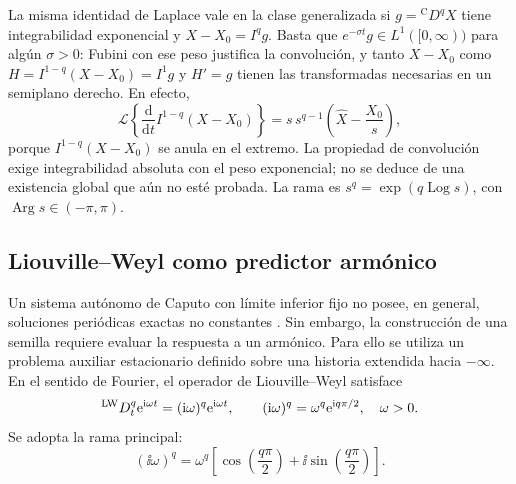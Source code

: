 La misma identidad de Laplace vale en la clase generalizada si
$g={}^{\mathrm C}D^qX$ tiene integrabilidad exponencial y
$X-X_0=I^qg$. Basta que $e^{-\sigma t}g\in L^1([0,\infty))$ para algún
$\sigma>0$: Fubini con ese peso justifica la convolución, y tanto
$X-X_0$ como $H=I^{1-q}(X-X_0)=I^1g$ y $H'=g$ tienen las
transformadas necesarias en un semiplano derecho. En efecto,
\[
 \mathcal L\!\left\{\frac{\mathrm d}{\mathrm dt}
 I^{1-q}(X-X_0)\right\}
 =s\,s^{q-1}\left(\widehat X-\frac{X_0}{s}\right),
\]
porque $I^{1-q}(X-X_0)$ se anula en el extremo.
La propiedad de convolución exige integrabilidad absoluta con el peso
exponencial; no se deduce de una existencia global que aún no esté probada.
La rama es $s^q=\exp(q\operatorname{Log}s)$, con
$\operatorname{Arg}s\in(-\pi,\pi)$.

\subsection{Liouville--Weyl como predictor armónico}

Un sistema autónomo de Caputo con límite inferior fijo no posee, en general,
soluciones periódicas exactas no constantes
\cite{TavazoeiHaeri2009,AreaLosadaNieto2014}. Sin embargo, la construcción de
una semilla requiere evaluar la respuesta a un armónico. Para ello se utiliza
un problema auxiliar estacionario definido sobre una historia extendida hacia
\(-\infty\). En el sentido de Fourier, el operador de Liouville--Weyl satisface
\cite{Vigue2019}
\begin{equation}
{}^{\mathrm{LW}}D_t^q\mathrm e^{\mathrm{i}\omega t}
=(\mathrm{i}\omega)^q\mathrm e^{\mathrm{i}\omega t},
\qquad
(\mathrm{i}\omega)^q
=\omega^q\mathrm e^{\mathrm{i} q\pi/2},
\quad \omega>0.
\label{eq:lw_armonico}
\end{equation}
Se adopta la rama principal:
\begin{equation}
(\ii\omega)^q
=\omega^q\left[
\cos\left(\frac{q\pi}{2}\right)
+\ii\sin\left(\frac{q\pi}{2}\right)
\right].
\label{eq:rama_principal}
\end{equation}


